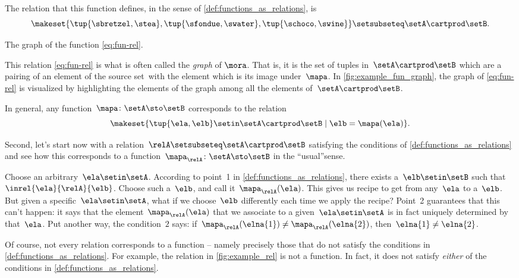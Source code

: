 The relation that this function defines, in the sense of \cref{def:functions_as_relations}, is
%
\begin{equation}
    \label{eq:fun-rel}
    \makeset{ \tup{\sbretzel, \stea}, \tup{\sfondue, \swater}, \tup{\schoco, \swine} } \setsubseteq \setA \cartprod \setB.
\end{equation}

\begin{marginfigure}
    \centering
    \caption{The graph of the function \cref{eq:fun-rel}.}
    \label{fig:example_fun_graph}
\end{marginfigure}

This relation \cref{eq:fun-rel} is what is often called the \emph{graph} of $\mora$.
That is, it is the set of tuples in~$\setA \cartprod \setB$ which are a pairing of an element of the source set~\setA with the element which is its image under~$\mapa$.
In \cref{fig:example_fun_graph}, the graph of \cref{eq:fun-rel} is visualized by highlighting the elements of the graph among all the elements of~$\setA \cartprod \setB$.

In general, any function~$\mapa \colon \setA \sto \setB$ corresponds to the relation
\begin{equation}
    \makeset{ \tup{\ela,\elb} \setin \setA \cartprod \setB \mid \elb= \mapa(\ela) }.
\end{equation}

Second, let's start now with a relation~$\relA \setsubseteq \setA \cartprod \setB$ satisfying the conditions of \cref{def:functions_as_relations} and see how this corresponds to a function~$\mapa_\relA \colon \setA \sto \setB$ in the ``usual''sense.

Choose an arbitrary~$\ela \setin \setA$.
According to point~1 in \cref{def:functions_as_relations}, there exists a~$\elb \setin \setB$ such that~$\inrel{\ela}{\relA}{\elb}$.
Choose such a~$\elb$, and call it~$\mapa_\relA(\ela)$.
This gives us recipe to get from any~$\ela$ to a~$\elb$.
But given a specific~$\ela \setin \setA$, what if we choose~$\elb$ differently each time we apply the recipe?
Point~2 guarantees that this can't happen: it says that the element~$\mapa_\relA(\ela)$ that we associate to a given~$\ela \setin \setA$ is in fact uniquely determined by that~$\ela$.
Put another way, the condition~$2$ says: if~$\mapa_\relA(\elna{1}) \neq \mapa_\relA(\elna{2})$, then~$\elna{1} \neq\elna{2}$.

\begin{remark}
    Of course, not every relation corresponds to a function -- namely precisely those that do not satisfy the conditions in \cref{def:functions_as_relations}.
    For example, the relation in \cref{fig:example_rel} is not a function.
    In fact, it does not satisfy \emph{either} of the conditions in \cref{def:functions_as_relations}.
\end{remark}

